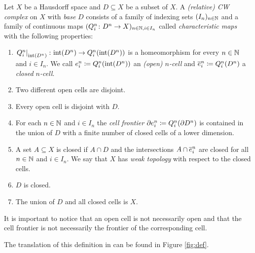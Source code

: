 \begin{defi}\label{def:cwcomplex}
    Let $X$ be a Hausdorff space and $D \subseteq X$ be a subset of $X$. 
    A \emph{(relative) CW complex} on $X$ with \emph{base} $D$ consists of a family of indexing sets $(I_n)_{n \in \bN}$ and a family of continuous maps $(Q_i^n \colon D^n \to X)_{n \in \bN, i \in I_n}$ called \emph{characteristic maps} with the following properties: 
    \begin{enumerate}
        \item $\restrict{Q_i^n}{\interior{D^n}} \colon \interior{D^n} \to Q_i^n(\interior{D^n})$ is a homeomorphism for every $n \in \bN$ and $i \in I_n$. We call $\openCell{n}{i} \coloneq Q_i^n(\interior{D^n})$ an \emph{(open) $n$-cell} and $\closedCell{n}{i} \coloneq Q_i^n(D^n)$ a \emph{closed $n$-cell}.
        \item Two different open cells are disjoint.
        \item Every open cell is disjoint with $D$.
        \item For each $n \in \bN$ and $i \in I_n$ the \emph{cell frontier} $\cellFrontier{n}{i} \coloneq Q_i^n(\boundary D^n)$ is contained in the union of $D$ with a finite number of closed cells of a lower dimension.
        \item A set $A \subseteq X$ is closed if $A \cap D$ and the intersections $A \cap \closedCell{n}{i}$ are closed for all $n \in \bN$ and $i \in I_n$. We say that $X$ has \emph{weak topology} with respect to the closed cells. 
        \item $D$ is closed. 
        \item The union of $D$ and all closed cells is $X$.
    \end{enumerate}
\end{defi}

It is important to notice that an open cell is not necessarily open and that the cell frontier is not necessarily the frontier of the corresponding cell.

The translation of this definition in \mathlib can be found in Figure \ref{fig:def}.

